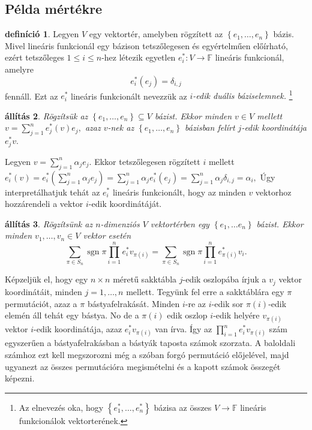 \documentclass[9pt, a4paper, showtrims]{memoir}
\makeatletter
\renewenvironment{proof}[1][\proofname]
    {\par\pushQED{\qed}%
    \normalfont \topsep6\p@\@plus6\p@\relax
    \trivlist
    \item[\hskip\labelsep
        \itshape
    #1\@addpunct{:}]\ignorespaces}
    {\popQED\endtrivlist\@endpefalse}
\theoremstyle{plain}
\newtheorem{proposition}{állítás}[chapter]
\theoremstyle{remark}
\theoremstyle{definition}
\newtheorem{definition}[proposition]{definíció}
\DeclareMathOperator{\sgn}{sgn}
\makeatother
\begin{document}
\subsection{Példa mértékre}
\begin{definition}
    Legyen $V$ egy vektortér, amelyben rögzített az $\left\{ e_1,\dots,e_n \right\}$
    bázis.
    Mivel lineáris funkcionál egy bázison tetszőlegesen és egyértelműen előírható,
    ezért tetszőleges $1\leq i\leq n$-hez létezik egyetlen $e_i^\ast:V\to\mathbb{F}$
    lineáris funkcionál, amelyre
    \[
        e_i^\ast(e_j)=\delta_{i,j}
    \]
    fennáll.
    Ezt az $e_i^\ast$ lineáris funkcionált nevezzük az \emph{$i$-edik duális báziselemnek.}%
    \footnote
    {
        Az elnevezés oka, 
        hogy $\left\{ e_1^\ast,\dots,e_n^\ast \right\}$ bázisa az összes $V\to\mathbb{F}$ lineáris funkcionálok vektorterének.
    }
\end{definition}
\begin{proposition}
    Rögzítsük az $\left\{ e_1,\dots,e_n \right\}\subseteq V$ bázist.
    Ekkor minden $v\in V$ mellett
    \(
        v=\sum_{j=1}^ne_j^\ast(v)e_j,
    \)
    azaz $v$-nek az $\left\{ e_1,\dots,e_n \right\}$ bázisban felírt $j$-edik koordinátája $e_j^\ast v.$
\end{proposition}
\begin{proof}
    Legyen $v=\sum_{j=1}^n\alpha_je_j$.
    Ekkor tetszőlegesen rögzített $i$ mellett
    \(
        e_i^\ast(v)
        =
        e_i^\ast\left( \sum_{j=1}^n\alpha_je_j \right)
        =
        \sum_{j=1}^n\alpha_je_i^\ast\left( e_j \right)
        =
        \sum_{j=1}^n\alpha_j\delta_{i,j}
        =
        \alpha_i,
    \)
\end{proof}
Úgy interpretálhatjuk tehát az $e_i^\ast$ lineáris funkcionált,
hogy az minden $v$ vektorhoz hozzárendeli a vektor $i$-edik koordinátáját.
\begin{proposition}
    Rögzítsünk az $n$-dimenziós $V$ vektortérben egy $\left\{ e_{1},\ldots e_{n}\right\} $ bázist. 
    Ekkor minden $v_1,\dots,v_n\in V$ vektor esetén
    \[
    \sum_{\pi \in S_{n}}\sgn\pi\prod_{i=1}^{n}e_{i}^{\ast }v_{\pi \left( i\right)}
    =
    \sum_{\pi \in S_{n}}\sgn\pi\prod_{i=1}^{n}e_{\pi \left( i\right)}^{\ast }v_{i}.
    \]
\end{proposition}
Képzeljük el, hogy egy $n\times n$ méretű sakktábla $j$-edik oszlopába írjuk a $v_j$ vektor koordinátáit,
minden $j=1,\dots,n$ mellett.
Tegyünk fel erre a sakktáblára egy $\pi$ permutációt, azaz a $\pi$ bástyafelrakását.
Minden $i$-re az $i$-edik sor $\pi\left( i \right)$-edik elemén áll tehát egy bástya.
No de a $\pi\left( i \right)$ edik oszlop $i$-edik helyére $v_{\pi\left( i \right)}$ vektor $i$-edik koordinátája,
azaz $e_i^\ast v_{\pi(i)}$ van írva.
Így az $\prod_{i=1}^n e_i^\ast v_{\pi\left( i \right)}$ szám egyszerűen a bástyafelrakásban a bástyák taposta számok szorzata.
A baloldali számhoz ezt kell megszorozni még a szóban forgó permutáció előjelével, 
majd ugyanezt az összes permutációra megismételni és a kapott számok összegét képezni.
\end{document}
